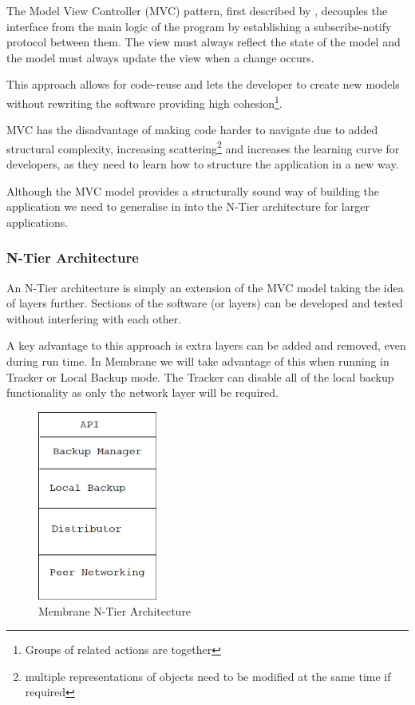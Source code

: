 \documentclass[11pt, a4paper, twoside]{report}
\begin{document}
The Model View Controller (MVC) pattern, first described by \cite{krasner1988cookbook}, decouples the interface from the main logic of the program by establishing a subscribe-notify protocol between them. The view must always reflect the state of the model and the model must always update the view when a change occurs.

This approach allows for code-reuse and lets the developer to create new models without rewriting the software providing high cohesion\footnote{Groups of related actions are together}.

MVC has the disadvantage of making code harder to navigate due to added structural complexity, increasing scattering\footnote{multiple representations of objects need to be modified at the same time if required} and increases the learning curve for developers, as they need to learn how to structure the application in a new way.

Although the MVC model provides a structurally sound way of building the application we need to generalise in into the N-Tier architecture for larger applications.

\subsubsection{N-Tier Architecture}

An N-Tier architecture is simply an extension of the MVC model taking the idea of layers further. Sections of the software (or layers) can be developed and tested without interfering with each other.

A key advantage to this approach is extra layers can be added and removed, even during run time. In Membrane we will take advantage of this when running in Tracker or Local Backup mode. The Tracker can disable all of the local backup functionality as only the network layer will be required.

\begin{figure}[b!]
 \centering
 \includegraphics[width=0.35\textwidth]{membrane-n-tier}
 \caption{Membrane N-Tier Architecture}
 \label{fig:membrane-n-tier}
\end{figure}
\end{document}
